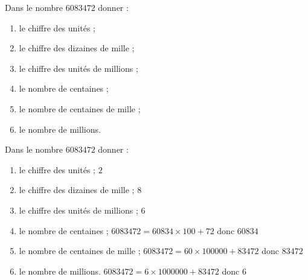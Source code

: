 \begin{exercice}
    Dans le nombre $\num{6083472}$ donner :
    \begin{enumerate}
       \item le chiffre des unités ;
       \item le chiffre des dizaines de mille ;
       \item le chiffre des unités de millions ;
       \item le nombre de centaines ;
       \item le nombre de centaines de mille ;
       \item le nombre de millions.
    \end{enumerate}
 \end{exercice}

 \begin{corrige}
    Dans le nombre $\num{6083472}$ donner :
    
    \begin{enumerate}
       \item le chiffre des unités ;                {\red $2$}
       \item le chiffre des dizaines de mille ;     {\red $8$}
       \item le chiffre des unités de millions ;    {\red $6$}
       \item le nombre de centaines ;               {\red $\num{6083472} = \num{60834}\times 100 + 72$ donc $\num{60834}$}
       \item le nombre de centaines de mille ;      {\red $\num{6083472} = 60\times \num{100000} + \num{83472}$ donc $\num{83472}$}
       \item le nombre de millions.                 {\red $\num{6083472} = 6\times \num{1000000} + \num{83472}$ donc $6$}
    \end{enumerate}
 \end{corrige}